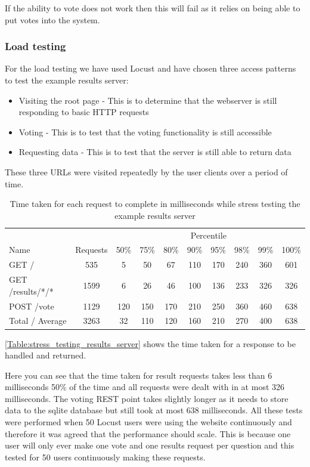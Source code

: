If the ability to vote does not work then this will fail as it relies on being able to put votes into the system.

\subsubsection{Load testing}

For the load testing we have used Locust and have chosen three access patterns to test the example results server:

\begin{itemize}
\item Visiting the root page - This is to determine that the webserver is still responding to basic HTTP requests
\item Voting - This is to test that the voting functionality is still accessible
\item Requesting data - This is to test that the server is still able to return data
\end{itemize}

These three URLs were visited repeatedly by the user clients over a period of time.

\begin{table}
\caption{Time taken for each request to complete in milliseconds while stress testing the example results server}
\begin{tabular}{l c  c c c c c c c c }
\hline 
& & \multicolumn{8}{c}{Percentile} \\
Name & Requests & 50\% & 75\% & 80\% & 90\% & 95\% & 98\% & 99\% & 100\% \\ 
\hline 
GET / & 535 & 5 & 50 & 67 & 110 & 170 & 240 & 360 & 601 \\ 
\hline 
GET /results/*/* & 1599 & 6 & 26 & 46 & 100 & 136 & 233 & 326 & 326 \\ 
\hline 
POST /vote & 1129 & 120 & 150 & 170 & 210 & 250 & 360 & 460 & 638 \\ 
\hline 
Total / Average & 3263 & 32 & 110 & 120 & 160 & 210 & 270 & 400 & 638 \\ 
\hline 
\end{tabular}
\label{Table:stress_testing_results_server}
\end{table}

\autoref{Table:stress_testing_results_server} shows the time taken for a response to be handled and returned.

Here you can see that the time taken for result requests takes less than 6 milliseconds 50\% of the time and all requests were dealt with in at most 326 milliseconds. The voting \gls{REST} point takes slightly longer as it needs to store data to the sqlite database but still took at most 638 milliseconds. All these tests were performed when 50 Locust users were using the website continuously and therefore it was agreed that the performance should scale. This is because one user will only ever make one vote and one results request per question and this tested for 50 users continuously making these requests.

